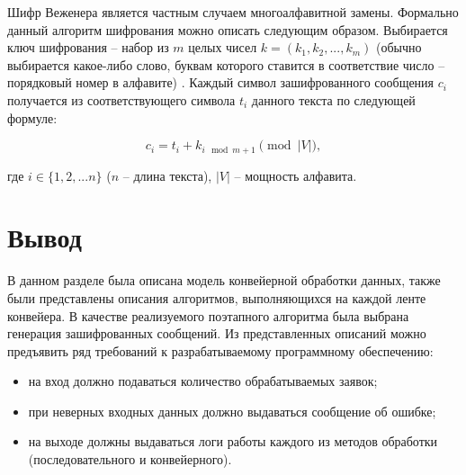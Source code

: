 Шифр Веженера является частным случаем многоалфавитной замены. Формально
данный алгоритм шифрования можно описать следующим образом. Выбирается ключ
шифрования -- набор из $m$ целых чисел $k = (k_1, k_2, ..., k_m)$ (обычно
выбирается какое-либо слово, буквам которого ставится в соответствие число --
порядковый номер в алфавите) \cite{Vegenere}. Каждый символ зашифрованного
сообщения $c_i$ получается из соответствующего символа $t_i$ данного текста по
следующей формуле:

\begin{equation}
    c_i = t_i + k_{i \mod m + 1} \pmod {|V|},
\end{equation}

где $i \in \{1, 2, ... n\}$ ($n$ -- длина текста), $|V|$ -- мощность алфавита.

\section{Вывод}

В данном разделе была описана модель конвейерной обработки данных, также были
представлены описания алгоритмов, выполняющихся на каждой ленте конвейера. В
качестве реализуемого поэтапного алгоритма была выбрана генерация зашифрованных
сообщений.  Из представленных описаний можно предъявить ряд требований к
разрабатываемому программному обеспечению:
\begin{itemize}[left=\parindent]
    \item на вход должно подаваться количество обрабатываемых заявок;
    \item при неверных входных данных должно выдаваться сообщение об ошибке;
    \item на выходе должны выдаваться логи работы каждого из методов обработки
        (последовательного и конвейерного).
\end{itemize}
